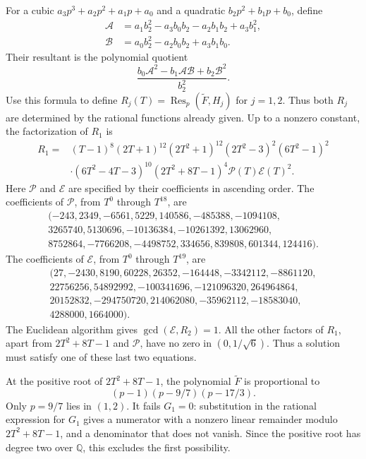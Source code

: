 \documentclass[11pt]{article}
\theoremstyle{definition}
\theoremstyle{remark}
\DeclareMathOperator{\Res}{Res}
\begin{document}
\begin{appendices}
For a cubic $a_3p^3+a_2p^2+a_1p+a_0$ and a quadratic $b_2p^2+b_1p+b_0$, define
\[
\begin{aligned}
\mathcal A&=a_1b_2^2-a_3b_0b_2-a_2b_1b_2+a_3b_1^2,\\
\mathcal B&=a_0b_2^2-a_2b_0b_2+a_3b_1b_0.
\end{aligned}
\]
Their resultant is the polynomial quotient
\[
\frac{b_0\mathcal A^2-b_1\mathcal A\mathcal B+b_2\mathcal B^2}{b_2^2}.
\]
Use this formula to define $R_j(T)=\Res_p(\widetilde F,H_j)$ for $j=1,2$. Thus both $R_j$ are determined by the rational functions already given. Up to a nonzero constant, the factorization of $R_1$ is
\begin{align*}
R_1={}&(T-1)^8(2T+1)^{12}(2T^2+1)^{12}(2T^2-3)^2(6T^2-1)^2\\
&\cdot(6T^2-4T-3)^{10}(2T^2+8T-1)^4\mathcal P(T)\mathcal E(T)^2.
\end{align*}
Here $\mathcal P$ and $\mathcal E$ are specified by their coefficients in ascending order. The coefficients of $\mathcal P$, from $T^0$ through $T^{18}$, are
\[
\begin{gathered}
(-243,2349,-6561,5229,140586,-485388,-1094108,\\
3265740,5130696,-10136384,-10261392,13062960,\\
8752864,-7766208,-4498752,334656,839808,601344,124416).
\end{gathered}
\]
The coefficients of $\mathcal E$, from $T^0$ through $T^{19}$, are
\[
\begin{gathered}
(27,-2430,8190,60228,26352,-164448,-3342112,-8861120,\\
22756256,54892992,-100341696,-121096320,264964864,\\
20152832,-294750720,214062080,-35962112,-18583040,\\
4288000,1664000).
\end{gathered}
\]
The Euclidean algorithm gives $\gcd(\mathcal E,R_2)=1$. All the other factors of $R_1$, apart from $2T^2+8T-1$ and $\mathcal P$, have no zero in $(0,1/\sqrt6)$. Thus a solution must satisfy one of these last two equations.

At the positive root of $2T^2+8T-1$, the polynomial $\widetilde F$ is proportional to
\[
(p-1)(p-9/7)(p-17/3).
\]
Only $p=9/7$ lies in $(1,2)$. It fails $G_1=0$: substitution in the rational expression for $G_1$ gives a numerator with a nonzero linear remainder modulo $2T^2+8T-1$, and a denominator that does not vanish. Since the positive root has degree two over $\mathbb Q$, this excludes the first possibility.


\end{appendices}
\end{document}
